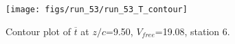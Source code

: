 \begin{figure}[H]
\centering
\texttt{[image: figs/run\_53/run\_53\_T\_contour]}
\caption{Contour plot of $\overline{t}$ at $z/c$=9.50, $V_{free}$=19.08, station 6.}
\label{fig:run_53_T_contour}
\end{figure}


